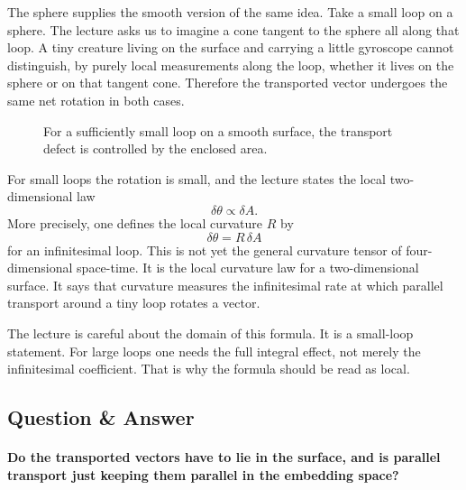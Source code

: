 The sphere supplies the smooth version of the same idea. Take a small loop on a sphere. The lecture asks us to imagine a cone tangent to the sphere all along that loop. A tiny creature living on the surface and carrying a little gyroscope cannot distinguish, by purely local measurements along the loop, whether it lives on the sphere or on that tangent cone. Therefore the transported vector undergoes the same net rotation in both cases.

\begin{figure}[h]
\centering
{}
\caption{For a sufficiently small loop on a smooth surface, the transport defect is controlled by the enclosed area.}
\end{figure}

For small loops the rotation is small, and the lecture states the local two-dimensional law
\begin{equation}
\delta\theta \propto \delta A.
\end{equation}
More precisely, one defines the local curvature \(R\) by
\begin{equation}
\delta\theta=R\,\delta A
\end{equation}
for an infinitesimal loop. This is not yet the general curvature tensor of four-dimensional space-time. It is the local curvature law for a two-dimensional surface. It says that curvature measures the infinitesimal rate at which parallel transport around a tiny loop rotates a vector.

The lecture is careful about the domain of this formula. It is a small-loop statement. For large loops one needs the full integral effect, not merely the infinitesimal coefficient. That is why the formula should be read as local.

\subsection{Question \& Answer}

\paragraph{Do the transported vectors have to lie in the surface, and is parallel transport just keeping them parallel in the embedding space?}

